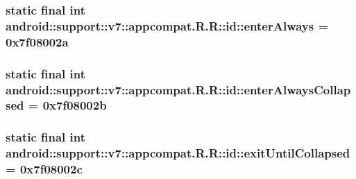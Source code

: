 \hypertarget{classandroid_1_1support_1_1v7_1_1appcompat_1_1_r_1_1id_40750a09d03fc08b0aa978ffb951055a}{
\subsubsection[{enterAlways}]{\setlength{\rightskip}{0pt plus 5cm}static final int android::support::v7::appcompat.R.R::id::enterAlways = 0x7f08002a}}
\label{classandroid_1_1support_1_1v7_1_1appcompat_1_1_r_1_1id_40750a09d03fc08b0aa978ffb951055a}


\hypertarget{classandroid_1_1support_1_1v7_1_1appcompat_1_1_r_1_1id_c3ea219a931fb2dedab85fb39c6acc2c}{
\subsubsection[{enterAlwaysCollapsed}]{\setlength{\rightskip}{0pt plus 5cm}static final int android::support::v7::appcompat.R.R::id::enterAlwaysCollapsed = 0x7f08002b}}
\label{classandroid_1_1support_1_1v7_1_1appcompat_1_1_r_1_1id_c3ea219a931fb2dedab85fb39c6acc2c}


\hypertarget{classandroid_1_1support_1_1v7_1_1appcompat_1_1_r_1_1id_03a3fe3f3605e2f32ca9c517e4b91870}{
\subsubsection[{exitUntilCollapsed}]{\setlength{\rightskip}{0pt plus 5cm}static final int android::support::v7::appcompat.R.R::id::exitUntilCollapsed = 0x7f08002c}}
\label{classandroid_1_1support_1_1v7_1_1appcompat_1_1_r_1_1id_03a3fe3f3605e2f32ca9c517e4b91870}


